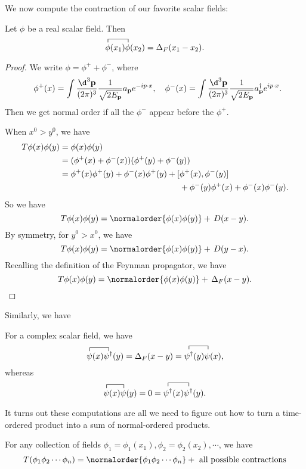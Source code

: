 \documentclass[a4paper]{article}
\begin{document}
We now compute the contraction of our favorite scalar fields:
\begin{prop}
  Let $\phi$ be a real scalar field. Then
  \[
    \contraction{}{\phi}{(x_1)}{\phi}\phi(x_1)\phi(x_2) = \Delta_F(x_1 - x_2).
  \]
\end{prop}

\begin{proof}
  We write $\phi = \phi^+ + \phi^-$, where
  \[
    \phi^+(x) = \int \frac{\d^3 \mathbf{p}}{(2\pi)^3} \frac{1}{\sqrt{2 E_\mathbf{p}}} a_\mathbf{p} e^{-ip\cdot x},\quad \phi^-(x) = \int \frac{\d^3 \mathbf{p}}{(2\pi)^3} \frac{1}{\sqrt{2 E_\mathbf{p}}} a_\mathbf{p}^\dagger e^{ip\cdot x}.
  \]
  Then we get normal order if all the $\phi^-$ appear before the $\phi^+$.

  When $x^0 > y^0$, we have
  \begin{align*}
    T\phi(x) \phi(y) ={}& \phi(x) \phi(y)\\
    ={}& (\phi^+(x) + \phi^-(x))(\phi^+(y) + \phi^-(y))\\
    ={}& \phi^+(x)\phi^+(y) + \phi^-(x) \phi^+(y) + [\phi^+(x), \phi^-(y)] \\
    &\hphantom{\phi^+(x)\phi^+(y) + \phi^-(x) \phi^+(y) + [}+ \phi^-(y) \phi^+(x) + \phi^-(x) \phi^-(y).
  \end{align*}
  So we have
  \[
    T\phi(x) \phi(y) = \normalorder{\phi(x) \phi(y)} + \, D(x - y).
  \]
  By symmetry, for $y^0 > x^0$, we have
  \[
    T\phi(x) \phi(y) = \normalorder{\phi(x)\phi(y)} + \, D(y - x).
  \]
  Recalling the definition of the Feynman propagator, we have
  \[
    T\phi(x)\phi(y) = \normalorder{\phi(x) \phi(y)} + \, \Delta_F(x - y). \qedhere
  \]
\end{proof}

Similarly, we have
\begin{prop}
   For a complex scalar field, we have
  \[
    \contraction{}{\psi}{(x)}{\psi^\dagger}\psi(x) \psi^\dagger(y) = \Delta_F(x - y) = \contraction{}{\psi^\dagger}{(u)}{\psi}\psi^\dagger(y) \psi(x),
  \]
  whereas
  \[
    \contraction{}{\psi}{(x)}{\psi} \psi(x) \psi(y) = 0 =\contraction{}{\psi^\dagger}{(x)}{\psi^\dagger} \psi^\dagger(x) \psi^\dagger(y).
  \]
\end{prop}

It turns out these computations are all we need to figure out how to turn a time-ordered product into a sum of normal-ordered products.

\begin{thm}
  For any collection of fields $\phi_1 = \phi_1(x_1), \phi_2 = \phi_2(x_2), \cdots$, we have
  \[
    T(\phi_1 \phi_2 \cdots \phi_n) = \normalorder{\phi_1 \phi_2 \cdots \phi_n} + \text{ all possible contractions}
  \]
\end{thm}
\end{document}

